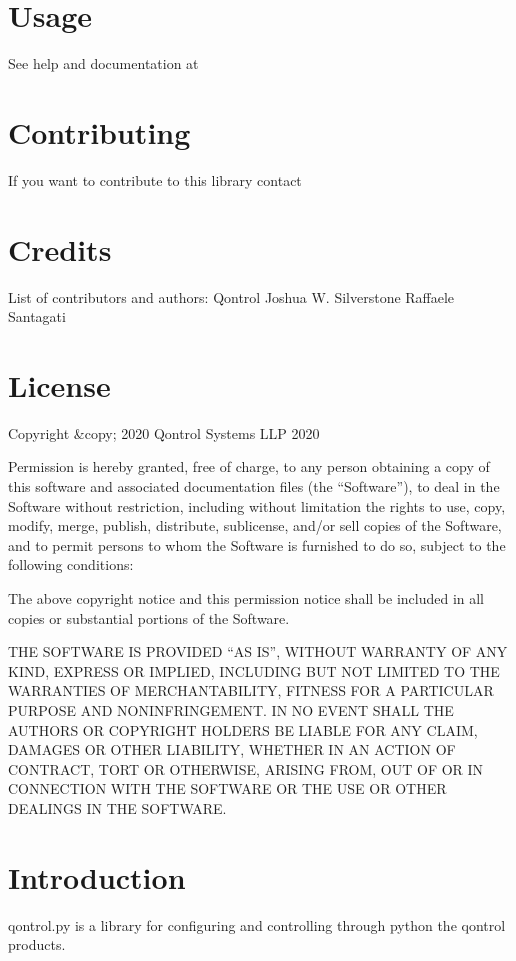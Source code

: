 \documentclass[letterpaper,10pt,english]{sphinxmanual}
\begin{document}
\chapter{Usage}
\label{\detokenize{includeme:usage}}
See help and documentation at 


\chapter{Contributing}
\label{\detokenize{includeme:contributing}}
If you want to contribute to this library contact 


\chapter{Credits}
\label{\detokenize{includeme:credits}}
List of contributors and authors:
Qontrol
Joshua W. Silverstone
Raffaele Santagati


\chapter{License}
\label{\detokenize{includeme:license}}
Copyright  \&copy; 2020 Qontrol Systems LLP 2020

Permission is hereby granted, free of charge, to any person obtaining a copy of this software and associated documentation files (the “Software”), to deal in the Software without restriction, including without limitation the rights to use, copy, modify, merge, publish, distribute, sublicense, and/or sell copies of the Software, and to permit persons to whom the Software is furnished to do so, subject to the following conditions:

The above copyright notice and this permission notice shall be included in all copies or substantial portions of the Software.

THE SOFTWARE IS PROVIDED “AS IS”, WITHOUT WARRANTY OF ANY KIND, EXPRESS OR IMPLIED, INCLUDING BUT NOT LIMITED TO THE WARRANTIES OF MERCHANTABILITY, FITNESS FOR A PARTICULAR PURPOSE AND NONINFRINGEMENT. IN NO EVENT SHALL THE AUTHORS OR COPYRIGHT HOLDERS BE LIABLE FOR ANY CLAIM, DAMAGES OR OTHER LIABILITY, WHETHER IN AN ACTION OF CONTRACT, TORT OR OTHERWISE, ARISING FROM, OUT OF OR IN CONNECTION WITH THE SOFTWARE OR THE USE OR OTHER DEALINGS IN THE SOFTWARE.


\chapter{Introduction}
\label{\detokenize{intro:introduction}}\label{\detokenize{intro::doc}}\label{\detokenize{intro:intro}}
qontrol.py is a library for configuring and controlling through python the qontrol products.
\end{document}
